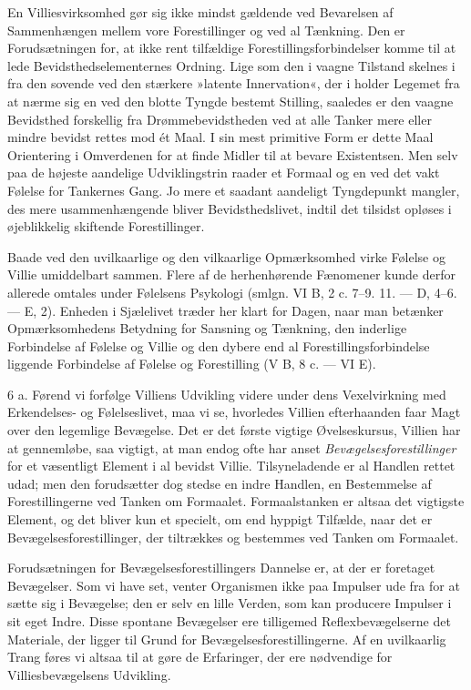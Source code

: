 \documentclass[12pt,a4paper,openany]{book}
\newcommand{\opage}[1]{\marginnote{\footnotesize\textit{[#1]}}}
\begin{document}
En Villiesvirksomhed gør sig ikke mindst gældende ved Bevarelsen af
Sammenhængen mellem vore Forestillinger og ved al Tænkning. Den er
Forudsætningen for, at ikke rent tilfældige Forestillingsforbindelser
komme til at lede Bevidsthedselementernes Ordning. Lige som den i vaagne
Tilstand skelnes i fra den sovende ved den stærkere »latente
Innervation«, der i holder Legemet fra at nærme sig en ved den blotte
Tyngde bestemt Stilling, saaledes er den vaagne Bevidsthed forskellig
fra Drømmebevidstheden ved at alle Tanker mere eller mindre bevidst
rettes mod ét Maal. I sin mest primitive Form er dette Maal Orientering
i Omverdenen for at finde Midler til at bevare Existentsen. Men selv paa
de højeste aandelige Udviklingstrin raader et Formaal og en ved det vakt
Følelse for Tankernes Gang. Jo mere et saadant aandeligt Tyngdepunkt
mangler, des mere usammenhængende bliver Bevidsthedslivet, indtil det
tilsidst opløses i øjeblikkelig skiftende Forestillinger.

Baade ved den uvilkaarlige og den vilkaarlige Opmærksomhed virke Følelse
og Villie umiddelbart sammen. Flere af de herhenhørende Fænomener kunde
derfor allerede omtales under Følelsens Psykologi (smlgn. VI B, 2 c.
7--9. 11. --- D, 4--6. --- E, 2). Enheden i Sjælelivet træder her klart
for Dagen, naar man betænker Opmærksomhedens Betydning for
\opage{375}Sansning og Tænkning, den inderlige Forbindelse af Følelse og
Villie og den dybere end al Forestillingsforbindelse liggende
Forbindelse af Følelse og Forestilling (V B, 8 c. --- VI E).

6 a. Førend vi forfølge Villiens Udvikling videre under dens
Vexelvirkning med Erkendelses- og Følelseslivet, maa vi se, hvorledes
Villien efterhaanden faar Magt over den legemlige Bevægelse. Det er det
første vigtige Øvelseskursus, Villien har at gennemløbe, saa vigtigt, at
man endog ofte har anset \emph{Bevægelsesforestillinger} for et
væsentligt Element i al bevidst Villie. Tilsyneladende er al Handlen
rettet udad; men den forudsætter dog stedse en indre Handlen, en
Bestemmelse af Forestillingerne ved Tanken om Formaalet. Formaalstanken
er altsaa det vigtigste Element, og det bliver kun et specielt, om end
hyppigt Tilfælde, naar det er Bevægelsesforestillinger, der tiltrækkes
og bestemmes ved Tanken om Formaalet.

Forudsætningen for Bevægelsesforestillingers Dannelse er, at der er
foretaget Bevægelser. Som vi have set, venter Organismen ikke paa
Impulser ude fra for at sætte sig i Bevægelse; den er selv en lille
Verden, som kan producere Impulser i sit eget Indre. Disse spontane
Bevægelser ere tilligemed Reflexbevægelserne det Materiale, der ligger
til Grund for Bevægelsesforestillingerne. Af en uvilkaarlig Trang føres
vi altsaa til at gøre de Erfaringer, der ere nødvendige for
Villiesbevægelsens Udvikling.
\end{document}
